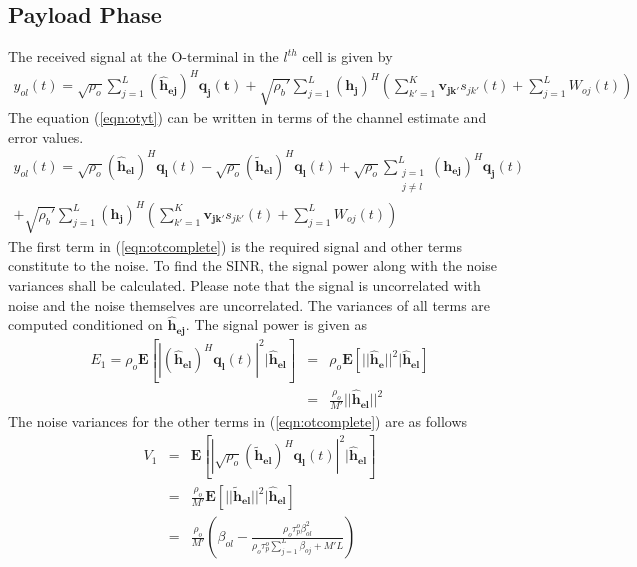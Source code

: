 \documentclass[10pt, a4paper, twoside,fleqn]{article}
\begin{document}
\subsection{Payload Phase}

The received signal at the O-terminal in the $l^{th}$ cell is given by
\begin{eqnarray}\label{eqn:otyt}
 y_{ol}(t) = \sqrt{\rho_o} \sum_{j=1}^{L} (\pmb{\hat h_{ej}})^H \pmb{q_j(t)}
            + \sqrt{\rho_b'} \sum_{j=1}^{L} (\pmb{h_j})^H \left(\sum_{k'=1}^{K} \pmb{v_{jk'}} s_{jk'}(t) + \sum_{j=1}^{L}W_{oj}(t)  \right)
\end{eqnarray} 
The equation (\ref{eqn:otyt}) can be written in terms of the channel estimate and error values.
\begin{eqnarray}\label{eqn:otcomplete}
  y_{ol}(t)= \sqrt{\rho_o} (\pmb{\hat h_{el}})^H \pmb{q_l}(t) 
	    - \sqrt{\rho_o}(\pmb{\widetilde{h}_{el}})^H\pmb{q_l}(t)
	    +\sqrt{\rho_o} \sum_{\substack{j=1 \\ j \neq l}}^{L} (\pmb{h_{ej}})^H\pmb{q_{j}}(t) \nonumber \\
            + \sqrt{\rho_b'} \sum_{j=1}^{L} (\pmb{h_j})^H \left(\sum_{k'=1}^{K} \pmb{v_{jk'}} s_{jk'}(t) 
	    + \sum_{j=1}^{L}W_{oj}(t)  \right)            
\end{eqnarray}
The first term in (\ref{eqn:otcomplete}) is the required signal and other terms constitute to the noise. To find the SINR, the signal power along with the noise variances shall be calculated. Please note that the signal is uncorrelated with noise and the noise themselves are uncorrelated.
The variances of all terms are computed conditioned on $\pmb{\hat h_{ej}}$. The signal power is given as
\begin{eqnarray}
	E_1 = \rho_o\pmb{E}[|(\pmb{\hat h_{el}})^H \pmb{q_l}(t)|^2 | \pmb{\hat h_{el}}] &=& \rho_o\pmb{E}[||\pmb{\hat h_e}||^2 | \pmb{\hat h_{el}}] \nonumber \\
                                                                                           &=& \frac{\rho_o}{M'} ||\pmb{\hat h_{el}}||^2
\end{eqnarray}
The noise variances for the other terms in (\ref{eqn:otcomplete}) are as follows
\begin{eqnarray}\label{eqn:otv1}
	V_1 &=& \pmb{E}[|\sqrt{\rho_o}(\pmb{\widetilde{h}_{el}})^H \pmb{q_l}(t)|^2|\pmb{\hat h_{el}}] \nonumber \\
            &=& \frac{\rho_o}{M'} \pmb{E}[||\pmb{\widetilde{h}_{el}}||^2 |\pmb{\hat h_{el}}] \nonumber \\
            &=& \frac{\rho_o}{M'}\left(\beta_{ol}-\frac{\rho_o\tau_p^o\beta^2_{ol}}{\rho_o\tau_p^o\sum_{j=1}^{L}\beta_{oj}+M'L}\right)          
\end{eqnarray}
\end{document}
